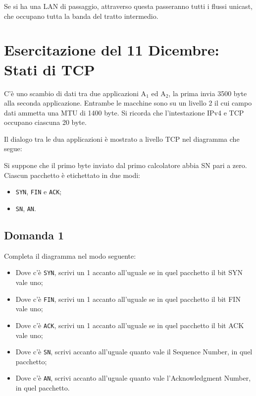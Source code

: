 \documentclass{article}
\numberwithin{equation}{subsection}
\begin{document}

Se si ha una LAN di passaggio, attraverso questa passeranno tutti i flussi unicast, che occupano tutta la banda del tratto intermedio. 

\clearpage

\section{Esercitazione del 11 Dicembre: Stati di TCP}

C'è uno scambio di dati tra due applicazioni A$_1$ ed A$_2$, la prima invia 3500 byte alla seconda applicazione. Entrambe le macchine sono su un livello 2 il cui campo 
dati ammetta una MTU di 1400 byte. Si ricorda che l'intestazione IPv4 e TCP occupano ciascuna 20 byte. 

Il dialogo tra le dua applicazioni è mostrato a livello TCP nel diagramma che segue: 


Si suppone che il primo byte inviato dal primo calcolatore abbia SN pari a zero. Ciascun pacchetto è etichettato in due modi:
\begin{itemize}
    \item \verb|SYN|, \verb|FIN| e \verb|ACK|;
    \item \verb|SN|, \verb|AN|. 
\end{itemize}

\subsection*{Domanda 1}

Completa il diagramma nel modo seguente: 
\begin{itemize}
    \item Dove c'è \verb|SYN|, scrivi un 1 accanto all'uguale se in quel pacchetto il bit SYN vale uno;
    \item Dove c'è \verb|FIN|, scrivi un 1 accanto all'uguale se in quel pacchetto il bit FIN vale uno;
    \item Dove c'è \verb|ACK|, scrivi un 1 accanto all'uguale se in quel pacchetto il bit ACK vale uno;
    \item Dove c'è \verb|SN|, scrivi accanto all'uguale quanto vale il Sequence Number, in quel pacchetto;
    \item Dove c'è \verb|AN|, scrivi accanto all'uguale quanto vale l'Acknowledgment Number, in quel pacchetto.
\end{itemize}
\end{document}
